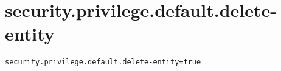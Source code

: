 \section{security.privilege.default.delete-entity}
\label{configuration:SecurityPrivilegeDefaultDeleteEntity}
\AvailableInJavaOnly{\TODO}
\begin{lstlisting}[style=Props,caption={Usage example for \textit{security.privilege.default.delete-entity}}]
security.privilege.default.delete-entity=true
\end{lstlisting}